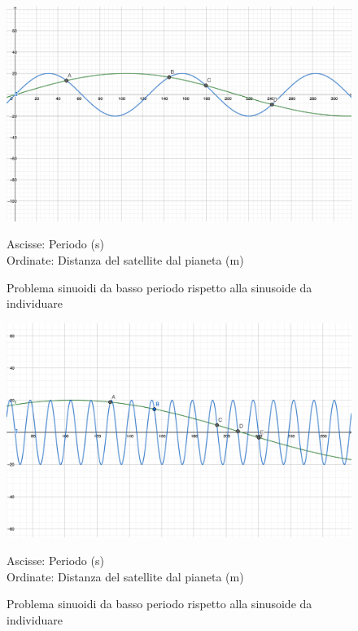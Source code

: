 \documentclass[a4paper,12pt]{report}
\begin{document}
\begin{figure}[H]
  \caption{Problema sinuoidi da basso periodo rispetto alla sinusoide da individuare}
  \begin{center}
  \includegraphics[scale=0.03]{img/bassoperiodo2.png}
  \end{center}
  Ascisse: Periodo (s) \\ Ordinate: Distanza del satellite dal pianeta (m)
  \label{fig:bassoperiodo2}
\end{figure}

\begin{figure}[H]

  \caption{Problema sinuoidi da basso periodo rispetto alla sinusoide da individuare}
  \begin{center}
  \includegraphics[scale=0.05]{img/bassoperiodo1.png}
  \end{center}
    Ascisse: Periodo (s) \\ Ordinate: Distanza del satellite dal pianeta (m)
  \label{fig:bassoperiodo1}
\end{figure}
\end{document}
